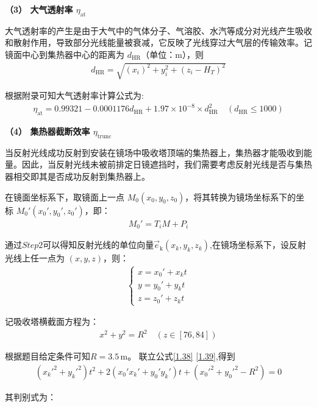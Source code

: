 \documentclass[../main.tex]{subfiles}
\begin{document}
\par \textbf{（3） 大气透射率 $\eta_{\text{at}}$}
\par 大气透射率的产生是由于大气中的气体分子、气溶胶、水汽等成分对光线产生吸收和散射作用，导致部分光线能量被衰减，它反映了光线穿过大气层的传输效率。记镜面中心到集热器中心的距离为 $d_{\text{HR}}$（单位：$\text{m}$），则
\begin{align}\label{1.36}
 d_{\text{HR}} = \sqrt{(x_i)^2 + y_i^2 + (z_i - H_T)^2}
 \end{align}
\par 根据附录可知大气透射率计算公式为:
\begin{align}\label{1.36}
  \eta_{\text{at}} = 0.99321 - 0.0001176d_{\text{HR}} + 1.97 \times 10^{-8} \times d_{\text{HR}}^2 \quad (d_{\text{HR}} \leq 1000) 
\end{align}
\par \textbf{（4） 集热器截断效率 $\eta_{\text{trunc}}$}
\par 当反射光线成功反射到安装在镜场中吸收塔顶端的集热器上，集热器才能吸收到能量。因此，当反射光线未被前排定日镜遮挡时，我们需要考虑反射光线是否与集热器相交即其是否成功反射到集热器上。
\par 在镜面坐标系下，取镜面上一点 \( M_0(x_0, y_0, z_0) \)，将其转换为镜场坐标系下的坐标 \( M_0'(x_0', y_0', z_0') \)，即：
\begin{align}    \label{1.37}
M_0' = T_i M + P_i
\end{align}
\par 通过$Step 2$可以得知反射光线的单位向量$\vec{e}_{\text{k}}(x_k,y_k,z_k)$,在镜场坐标系下，设反射光线上任一点为 \( (x, y, z) \)，则：
\begin{align}\label{1.38}
  \begin{cases}
x = x_0' + x_k t \\
y = y_0' + y_k t \\
z = z_0' + z_k t
\end{cases}
\end{align}
\par 记吸收塔横截面方程为：
\begin{align}    \label{1.39}
x^2 + y^2 = R^2 \quad ( z \in [76, 84])
\end{align}
\par 根据题目给定条件可知\( R = 3.5 \, \text{m} \)。 联立公式\eqref{1.38} \eqref{1.39},得到
\begin{align}    \label{1.40}
(x_{k}'^{2}+y_{k}'^{2})t^{2}+2(x_{0}'x_{k}'+y_{0}'y_{k}')t+(x_{0}'^{2}+y_{0}'^{2}-R^{2}) = 0
\end{align}
\par 其判别式为：
\end{document}
